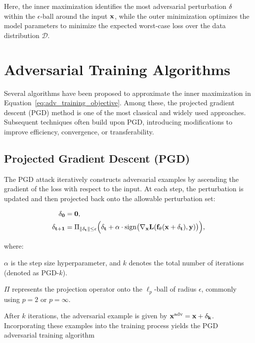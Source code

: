 \documentclass[10pt,twocolumn,letterpaper]{article}
\begin{document}
Here, the inner maximization identifies the most adversarial perturbation $\bf{\delta}$ within the $\epsilon$-ball around the input $\bf{x}$, while the outer minimization optimizes the model parameters to minimize the expected worst-case loss over the data distribution $\mathcal{D}$.

\section{Adversarial Training Algorithms}
Several algorithms have been proposed to approximate the inner maximization in Equation~\eqref{eq:adv_training_objective}. Among these, the projected gradient descent (PGD) method is one of the most classical and widely used approaches. Subsequent techniques often build upon PGD, introducing modifications to improve efficiency, convergence, or transferability.

\subsection{Projected Gradient Descent (PGD)}
The PGD attack iteratively constructs adversarial examples by ascending the gradient of the loss with respect to the input. At each step, the perturbation is updated and then projected back onto the allowable perturbation set:

$$
\begin{aligned}
\bf{\delta}_{0} &= \bf{0}, \\
\bf{\delta}_{t+1} &= \Pi_{{\lVert \bf{\delta_t} \rVert \le \epsilon}} \Bigl(\bf{\delta}_{t} + \alpha \cdot \mathrm{sign}\bigl(\nabla_{\bf{x}} L(f_{\theta}(\bf{x} + \bf{\delta}_{t}), \bf{y})\bigr)\Bigr),
\end{aligned}
$$

where:

$\alpha$ is the step size hyperparameter, and $k$ denotes the total number of iterations (denoted as PGD-$k$).

$\Pi$ represents the projection operator onto the $\ell_{p}$-ball of radius $\epsilon$, commonly using $p=2$ or $p=\infty$.

After $k$ iterations, the adversarial example is given by $\bf{x}^{\mathrm{adv}} = \bf{x} + \bf{\delta}_{k}$. Incorporating these examples into the training process yields the PGD adversarial training algorithm
\end{document}

